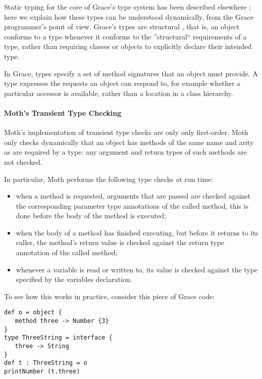 \documentclass[sigplan,screen]{acmart}
\begin{document}
Static typing for the core of Grace's type system has been described
elsewhere \citep{TimJonesThesis};
here we explain how
these types can be understood 
dynamically, from the Grace programmer's point of view.
Grace's types are structural \citep{graceOnward12},
that is, an object conforms to a type whenever it conforms to the ''structural`` requirements of a type,
rather than requiring classes or objects to explicitly declare their intended type.

In Grace, types specify a set of method signatures that an object must provide. A type expresses the requests an object can respond to, for example whether a particular accessor is available, rather than a location in a class hierarchy.

\paragraph{Moth's Transient Type Checking}
Moth's implementation of transient type checks are only only first-order.
Moth only checks dynamically that an object has methods of the same name and arity as are required by a type:  any argument and return types of such methods are not checked.

In particular, Moth performs the following type checks at run time:
\begin{itemize}
\item when a method is requested, arguments that are passed are checked against the corresponding parameter type annotations of the called method, this is done before the body of the method is executed;
\item when the body of a method has finished executing, but before it returns to its caller, the method's return value is checked against the return type annotation of the called method;
\item whenever a variable is read or written to, its value is checked against the type specified by the variables declaration.
\end{itemize}

To see how this works in practice, consider this piece of Grace code:

\begin{minipage}{\linewidth}
\begin{lstlisting}
def o = object {
   method three -> Number {3}
}
type ThreeString = interface {
   three -> String
}
def t : ThreeString = o
printNumber (t.three)
\end{lstlisting}
\end{minipage}
\end{document}
